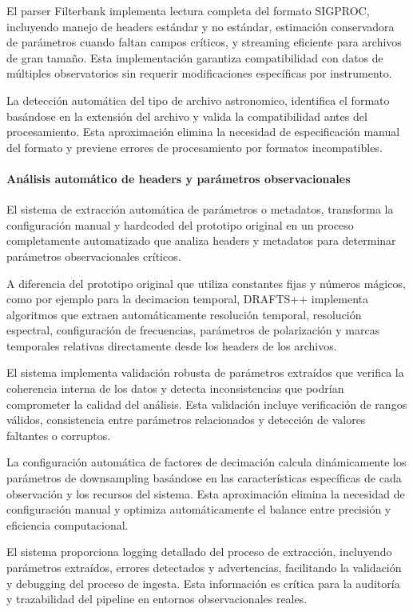 El parser Filterbank implementa lectura completa del formato SIGPROC, incluyendo manejo de headers estándar y no estándar, estimación conservadora de parámetros cuando faltan campos críticos, y streaming eficiente para archivos de gran tamaño. Esta implementación garantiza compatibilidad con datos de múltiples observatorios sin requerir modificaciones específicas por instrumento.

La detección automática del tipo de archivo  astronomico, identifica el formato basándose en la extensión del archivo y valida la compatibilidad antes del procesamiento. Esta aproximación elimina la necesidad de especificación manual del formato y previene errores de procesamiento por formatos incompatibles.

\paragraph{Análisis automático de headers y parámetros observacionales}

El sistema de extracción automática de parámetros o metadatos, transforma la configuración manual y hardcoded del prototipo original en un proceso completamente automatizado que analiza headers y metadatos para determinar parámetros observacionales críticos.

A diferencia del prototipo original que utiliza constantes fijas y números mágicos, como por ejemplo para la decimacion temporal, DRAFTS++ implementa algoritmos que extraen automáticamente resolución temporal, resolución espectral, configuración de frecuencias, parámetros de polarización y marcas temporales relativas directamente desde los headers de los archivos.

El sistema implementa validación robusta de parámetros extraídos que verifica la coherencia interna de los datos y detecta inconsistencias que podrían comprometer la calidad del análisis. Esta validación incluye verificación de rangos válidos, consistencia entre parámetros relacionados y detección de valores faltantes o corruptos.

La configuración automática de factores de decimación calcula dinámicamente los parámetros de downsampling basándose en las características específicas de cada observación y los recursos del sistema. Esta aproximación elimina la necesidad de configuración manual y optimiza automáticamente el balance entre precisión y eficiencia computacional.

El sistema proporciona logging detallado del proceso de extracción, incluyendo parámetros extraídos, errores detectados y advertencias, facilitando la validación y debugging del proceso de ingesta. Esta información es crítica para la auditoría y trazabilidad del pipeline en entornos observacionales reales.

